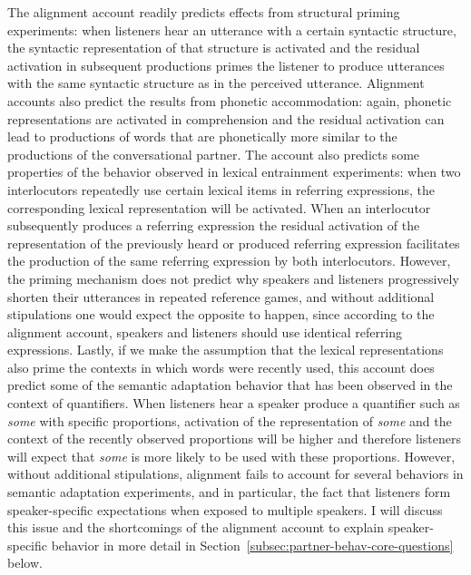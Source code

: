 The alignment account readily predicts effects from structural priming experiments: when listeners hear an utterance with a certain syntactic structure,
the syntactic representation of that structure is activated and the residual activation in subsequent productions primes the listener to produce utterances
with the same syntactic structure as in the perceived utterance. Alignment accounts also predict the results from phonetic accommodation: again,
phonetic representations are activated in comprehension and the residual activation can lead to productions of words that are phonetically more similar to the
productions of the conversational partner. The account also predicts some properties of the behavior observed in lexical entrainment experiments: 
when two interlocutors repeatedly use certain lexical items in referring expressions, the corresponding lexical representation will be activated. When an interlocutor 
subsequently produces a referring expression the residual activation of the representation of the previously heard or produced referring expression facilitates the production
of the same referring expression by both interlocutors. However, the priming mechanism does not predict why speakers and listeners 
progressively shorten their utterances in repeated reference games, and without additional stipulations one would expect the opposite to happen, since according
to the alignment account, speakers and listeners should use identical referring expressions. Lastly, if we make the assumption that the lexical representations
also prime the contexts in which words were recently used, this account does predict some of the semantic adaptation behavior that has been observed in the 
context of quantifiers. When listeners hear a speaker produce a quantifier such as \textit{some} with specific proportions, activation of the representation of \textit{some} and the 
context of the recently observed proportions will be higher and therefore listeners will expect that \textit{some} is more likely to be used with these proportions. However,
without additional stipulations, alignment fails to account for several behaviors in semantic adaptation experiments, and in particular, the fact that listeners form speaker-specific
expectations when exposed to multiple speakers. I will discuss this issue and the shortcomings of the 
alignment account to explain speaker-specific behavior in more detail in Section~\ref{subsec:partner-behav-core-questions} below.





